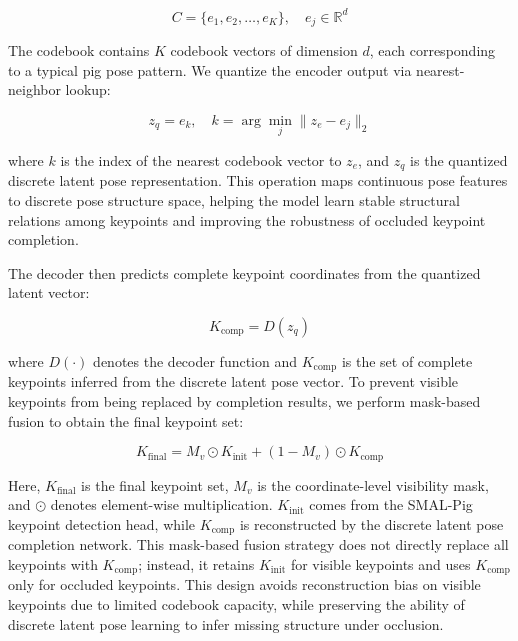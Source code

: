 \documentclass[computers,article,submit,pdftex,moreauthors]{mdpi}
\begin{document}
\begin{equation}
C = \{e_1, e_2, \ldots, e_K\}, \quad e_j \in \mathbb{R}^d
\end{equation}

The codebook contains $K$ codebook vectors of dimension $d$, each corresponding to a typical pig pose pattern. We quantize the encoder output via nearest-neighbor lookup:

\begin{equation}
z_q = e_k, \quad k = \arg\min_j \|z_e - e_j\|_2
\end{equation}

where $k$ is the index of the nearest codebook vector to $z_e$, and $z_q$ is the quantized discrete latent pose representation. This operation maps continuous pose features to discrete pose structure space, helping the model learn stable structural relations among keypoints and improving the robustness of occluded keypoint completion.

The decoder then predicts complete keypoint coordinates from the quantized latent vector:

\begin{equation}
K_{\text{comp}} = D(z_q)
\end{equation}

where $D(\cdot)$ denotes the decoder function and $K_{\text{comp}}$ is the set of complete keypoints inferred from the discrete latent pose vector. To prevent visible keypoints from being replaced by completion results, we perform mask-based fusion to obtain the final keypoint set:

\begin{equation}
K_{\text{final}} = M_v \odot K_{\text{init}} + (1 - M_v) \odot K_{\text{comp}}
\end{equation}

Here, $K_{\text{final}}$ is the final keypoint set, $M_v$ is the coordinate-level visibility mask, and $\odot$ denotes element-wise multiplication. $K_{\text{init}}$ comes from the SMAL-Pig keypoint detection head, while $K_{\text{comp}}$ is reconstructed by the discrete latent pose completion network. This mask-based fusion strategy does not directly replace all keypoints with $K_{\text{comp}}$; instead, it retains $K_{\text{init}}$ for visible keypoints and uses $K_{\text{comp}}$ only for occluded keypoints. This design avoids reconstruction bias on visible keypoints due to limited codebook capacity, while preserving the ability of discrete latent pose learning to infer missing structure under occlusion.
\end{document}
